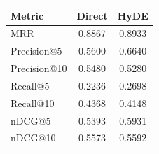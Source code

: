 \begin{tabular}{lcc}
\hline
Metric & Direct & HyDE \\
\hline
MRR & 0.8867 & 0.8933 \\
Precision@5 & 0.5600 & 0.6640 \\
Precision@10 & 0.5480 & 0.5280 \\
Recall@5 & 0.2236 & 0.2698 \\
Recall@10 & 0.4368 & 0.4148 \\
nDCG@5 & 0.5393 & 0.5931 \\
nDCG@10 & 0.5573 & 0.5592 \\
\hline
\end{tabular}
